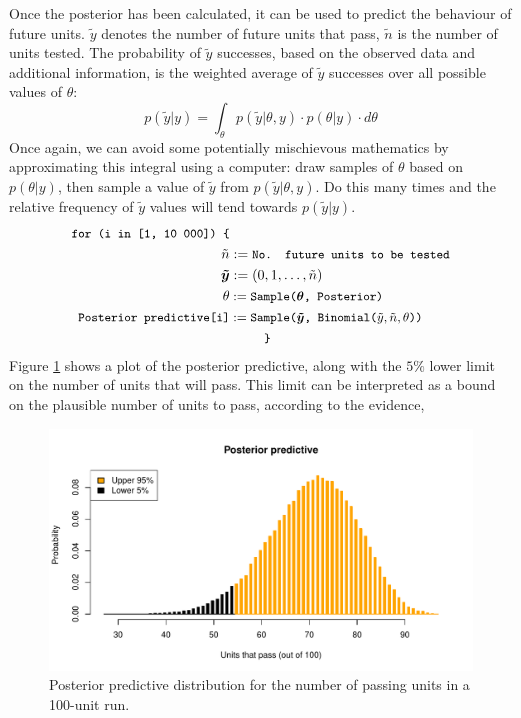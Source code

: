 \documentclass[11pt,a4paper,article]{memoir} %
\begin{document}
Once the posterior has been calculated, it can be used to predict the behaviour of future units. $\tilde{y}$ denotes the number of future units that pass, $\tilde{n}$ is the number of units tested. The probability of $\tilde{y}$ successes, based on the observed data and additional information, is the weighted average of $\tilde{y}$ successes over all possible values of $\theta$:
\begin{equation}
	p(\tilde{y}|y) = \int_{\theta}p(\tilde{y}|\theta, y)\cdot p(\theta|y) \cdot d\theta
\end{equation}
Once again, we can avoid some potentially mischievous mathematics by approximating this integral using a computer: draw samples of $\theta$ based on $p(\theta|y)$, then sample a value of $\tilde{y}$ from $p(\tilde{y}|\theta, y)$. Do this many times and the relative frequency of $\tilde{y}$ values will tend towards $p(\tilde{y}|y)$.
\begin{align}
\small{\texttt{for (i in [1, 10 000]) \{}} &\\
	\tilde{n} &:= \small{\texttt{No. future units to be tested}} \\
	\boldsymbol{\tilde{y}} &:= (0, 1, \dots, \tilde{n}) \\
	\theta &:= \small{\texttt{Sample(}}\boldsymbol{\theta}\small{\texttt{, Posterior)}} \\
	\small{\texttt{Posterior predictive[i]}} &:= \small{\texttt{Sample(}}\boldsymbol{\tilde{y}}\small{\texttt{, Binomial(}}\tilde{y}, \tilde{n}, \theta\small{\texttt{))}}\\
	&\quad\quad \small{\texttt{ \} }}
\end{align}
Figure \ref{fig:posterior_predictive} shows a plot of the posterior predictive, along with the $5\%$ lower limit on the number of units that will pass. This limit can be interpreted as a bound on the plausible number of units to pass, according to the evidence,
\begin{figure}
\includegraphics[width=\textwidth]{posterior_predictive.pdf}
\caption{Posterior predictive distribution for the number of passing units in a 100-unit run.}
\label{fig:posterior_predictive}
\end{figure}
\end{document}
